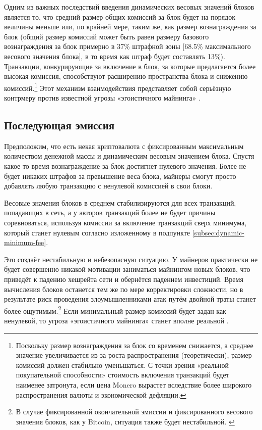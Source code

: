 Одним из важных последствий введения динамических весовых значений блоков является то, что средний размер общих комиссий за блок будет на порядок величины меньше или, по крайней мере, таким же, как размер вознаграждения за блок (общий размер комиссий может быть равен размеру базового вознаграждения за блок примерно в 37\% штрафной зоны [68.5\% максимального весового значения блока], в то время как штраф будет составлять 13\%). Транзакции, конкурирующие за включение в блок, за которые предлагается более высокая комиссия, способствуют расширению пространства блока и снижению комиссий.\footnote{Поскольку размер вознаграждения за блок со временем снижается, а среднее значение увеличивается из-за роста распространения (теоретически), размер комиссий должен стабильно уменьшаться. С точки зрения «реальной покупательной способности» стоимость включения транзакций будет наименее затронута, если цена Monero вырастет вследствие более широкого распространения валюты и экономической дефляции.} Этот механизм взаимодействия представляет собой серьёзную контрмеру против известной угрозы «эгоистичного майнинга» \cite{selfish-miner}.


\subsection{Последующая эмиссия}
\label{subsec:emission-tail}

Предположим, что есть некая криптовалюта с фиксированным максимальным количеством денежной массы и динамическим весовым значением блока. Спустя какое-то время возна\-граждение за блок достигнет нулевого значения. Более не будет никаких штрафов за превы\-шение веса блока, майнеры смогут просто добавлять любую транзакцию с ненулевой комисси\-ей в свои блоки.

Весовые значения блоков в среднем стабилизируются для всех транзакций, попадающих в сеть, а у авторов транзакций более не будет причины соревноваться, используя комиссии за включение транзакций сверх минимума, который станет нулевым согласно изложенному в подпункте \ref{subsec:dynamic-minimum-fee}.

Это создаёт нестабильную и небезопасную ситуацию. У майнеров практически не будет совершенно никакой мотивации заниматься майнингом новых блоков, что приведёт к падению хешрейта сети и обернётся падением инвестиций. Время вычисления блоков останется тем же по мере корректировки сложности, но в результате риск проведения злоумышленниками атак путём двойной траты станет более ощутимым.\footnote{В случае фиксированной окончательной эмиссии и фиксированного весового значения блоков, как у Bitcoin, ситуация также будет нестабильной. \cite{no-reward-instability}} Если минимальный размер комиссий будет задан как ненулевой, то угроза «эгоистичного майнинга» \cite{selfish-miner} станет вполне реальной \cite{no-reward-instability}.\\

